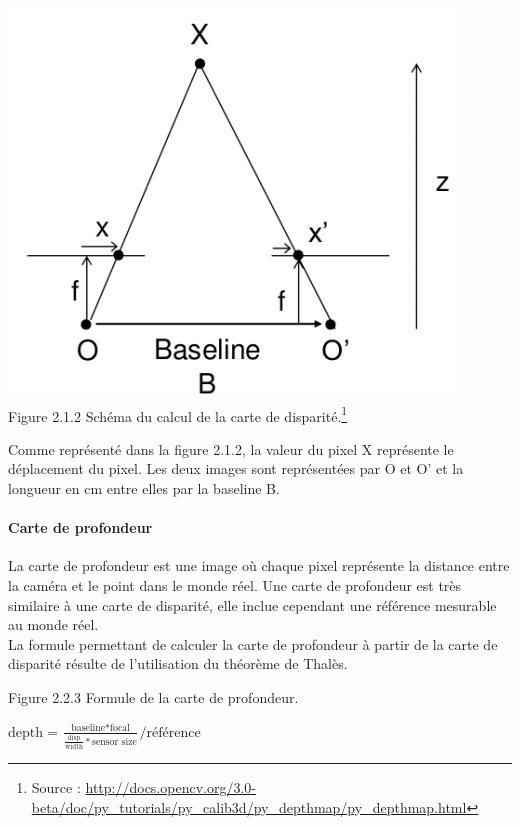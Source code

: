 \documentclass[12pt,a4paper]{report}
\begin{document}
\begin{center}
	\includegraphics[scale=0.5]{disparity.jpg}\\
	Figure 2.1.2 Schéma du calcul de la carte de disparité.\footnote{Source : \url{http://docs.opencv.org/3.0-beta/doc/py_tutorials/py_calib3d/py_depthmap/py_depthmap.html}}\\
\end{center}

Comme représenté dans la figure 2.1.2, la valeur du pixel X représente le déplacement du pixel.
Les deux images sont représentées par O et O' et la longueur en cm entre elles par la baseline B.
\paragraph{Carte de profondeur}
La carte de profondeur est une image où chaque pixel représente la distance entre la caméra et le point dans le monde réel. Une carte de profondeur est très similaire à une carte de disparité, elle inclue cependant une référence mesurable au monde réel.\\
La formule permettant de calculer la carte de profondeur à partir de la carte de disparité résulte de l'utilisation du théorème de Thalès.\\

\begin{center}
Figure 2.2.3 Formule de la carte de profondeur.\\

\begin{huge}
$\text{depth} = \frac{\text{baseline} * \text{focal}}{\frac{\text{disp}}{\text{width}} * \text{sensor size}} / \text{référence}$\\
\end{huge}
\end{center}
\end{document}
